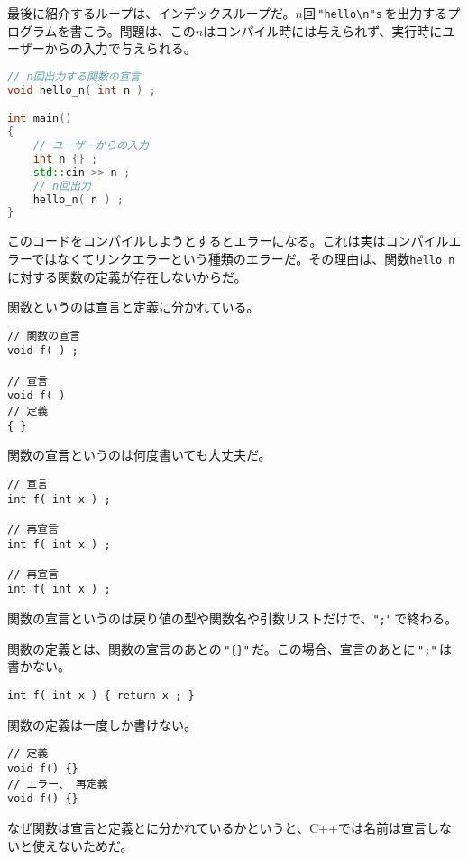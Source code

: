 最後に紹介するループは、インデックスループだ。\(n\)回\,\texttt{"hello{\textbackslash}n"s}\,を出力するプログラムを書こう。問題は、この\(n\)はコンパイル時には与えられず、実行時にユーザーからの入力で与えられる。

\begin{lstlisting}[language={C++}]
// n回出力する関数の宣言
void hello_n( int n ) ;

int main()
{
    // ユーザーからの入力
    int n {} ;
    std::cin >> n ;
    // n回出力
    hello_n( n ) ;
}
\end{lstlisting}

このコードをコンパイルしようとするとエラーになる。これは実はコンパイルエラーではなくてリンクエラーという種類のエラーだ。その理由は、関数\texttt{hello\_n}に対する関数の定義が存在しないからだ。

関数というのは宣言と定義に分かれている。

\ifTombow\pagebreak\fi
\begin{lstlisting}[style=grammar]
// 関数の宣言
void f( ) ;

// 宣言
void f( )
// 定義
{ }
\end{lstlisting}

関数の宣言というのは何度書いても大丈夫だ。

\begin{lstlisting}[style=grammar]
// 宣言
int f( int x ) ;

// 再宣言
int f( int x ) ;

// 再宣言
int f( int x ) ;
\end{lstlisting}

関数の宣言というのは戻り値の型や関数名や引数リストだけで、\texttt{";"}\,で終わる。

関数の定義とは、関数の宣言のあとの\,\texttt{"\{\}"}\,だ。この場合、宣言のあとに\,\texttt{";"}\,は書かない。

\begin{lstlisting}[style=grammar]
int f( int x ) { return x ; }
\end{lstlisting}

関数の定義は一度しか書けない。

\begin{lstlisting}[style=grammar]
// 定義
void f() {}
// エラー、 再定義
void f() {}
\end{lstlisting}

なぜ関数は宣言と定義とに分かれているかというと、C++では名前は宣言しないと使えないためだ。

